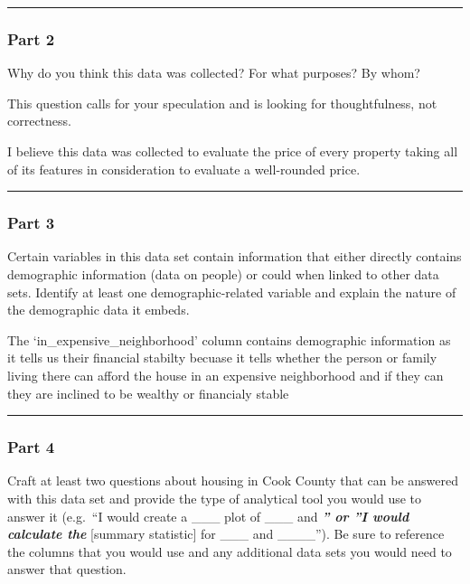 \documentclass[11pt]{article}
\begin{document}
    \begin{center}\rule{0.5\linewidth}{0.5pt}\end{center}

\hypertarget{part-2}{%
\subsubsection{Part 2}\label{part-2}}

Why do you think this data was collected? For what purposes? By whom?

This question calls for your speculation and is looking for
thoughtfulness, not correctness.

    I believe this data was collected to evaluate the price of every
property taking all of its features in consideration to evaluate a
well-rounded price.

    \begin{center}\rule{0.5\linewidth}{0.5pt}\end{center}

\hypertarget{part-3}{%
\subsubsection{Part 3}\label{part-3}}

Certain variables in this data set contain information that either
directly contains demographic information (data on people) or could when
linked to other data sets. Identify at least one demographic-related
variable and explain the nature of the demographic data it embeds.

    The `in\_expensive\_neighborhood' column contains demographic
information as it tells us their financial stabilty becuase it tells
whether the person or family living there can afford the house in an
expensive neighborhood and if they can they are inclined to be wealthy
or financialy stable

    \begin{center}\rule{0.5\linewidth}{0.5pt}\end{center}

\hypertarget{part-4}{%
\subsubsection{Part 4}\label{part-4}}

Craft at least two questions about housing in Cook County that can be
answered with this data set and provide the type of analytical tool you
would use to answer it (e.g.~``I would create a \_\_\_ plot of \_\_\_
and \textbf{\emph{'' or ''I would calculate the }} {[}summary
statistic{]} for \_\_\_ and \_\_\_\_''). Be sure to reference the
columns that you would use and any additional data sets you would need
to answer that question.
\end{document}
